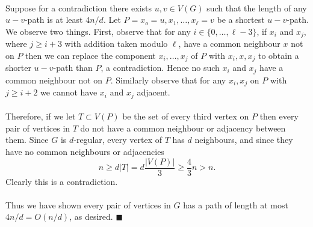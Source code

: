 \documentclass[letterpaper,12pt,oneside,onecolumn]{article}
\begin{document}
\paragraph{}
Suppose for a contradiction there exists $u,v \in V(G)$ such that the length of any $u-v$-path is at least $4n/d$. Let $P=x_o=u, x_1, \dots, x_\ell=v$ be a shortest $u-v$-path. We observe two things. First, observe that for any $i \in \{0,\dots, \ell-3\}$, if $x_i$ and $x_{j}$, where $j \geq i+3$ with addition taken modulo $\ell$, have a common neighbour $x$ not on $P$ then we can replace the component $x_i,\dots, x_j$ of $P$ with $x_i, x, x_{j}$ to obtain a shorter $u-v$-path than $P$, a contradiction. Hence no such $x_i$ and $x_{j}$ have a common neighbour not on $P$. Similarly observe that for any $x_i, x_j$ on $P$ with $j \geq i+2$ we cannot have $x_i$ and $x_j$ adjacent. 
\paragraph{}
Therefore, if we let $T\subset V(P)$ be the set of every third vertex on $P$ then every pair of vertices in $T$ do not have a common neighbour or adjacency between them. Since $G$ is $d$-regular, every vertex of $T$ has $d$ neighbours, and since they have no common neighbours or adjacencies
$$n \geq d|T| =d\frac{|V(P)|}{3} \geq \frac{4}{3}n > n.$$
Clearly this is a contradiction.
\paragraph{}
Thus we have shown every pair of vertices in $G$ has a path of length at most $4n/d = O(n/d)$, as desired. $\blacksquare$
\newpage
\section{}

\newpage
\section{}

\newpage
\section{}
\end{document}
